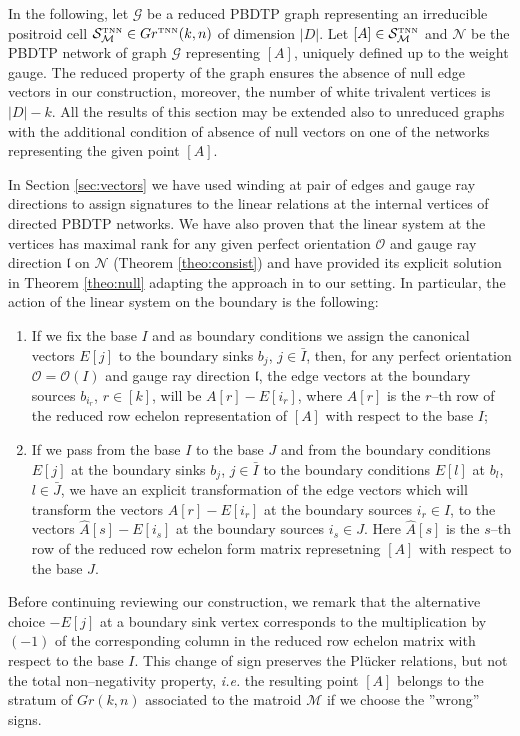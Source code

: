 \documentclass[11pt]{amsart}
\theoremstyle{plain}
\numberwithin{equation}{section}
\def \GTNN {{Gr^{\mbox{\tiny TNN}} (k,n)}}
\def \S {{\mathcal S}_{\mathcal M}^{\mbox{\tiny TNN}}}
\begin{document}
In the following, let $\mathcal G$ be a reduced PBDTP graph representing an irreducible positroid cell $\S \in \GTNN$ of dimension $|D|$. Let $[A]\in \S$ and $\mathcal N$ be the PBDTP network of graph $\mathcal G$ representing $[A]$, uniquely defined up to the weight gauge. The reduced property of the graph ensures the absence of null edge vectors in our construction, moreover, the number of white trivalent vertices is $|D|-k$. All the results of this section may be extended also to unreduced graphs with the additional condition of absence of null vectors on one of the networks representing the given point $[A]$.

In Section \ref{sec:vectors} we have used winding at pair of edges and gauge ray directions to assign signatures to the linear relations at the internal vertices of directed PBDTP networks. We have also proven that the linear system at the vertices has maximal rank for any given perfect orientation $\mathcal O$ and gauge ray direction $\mathfrak l$ on $\mathcal N$ (Theorem \ref{theo:consist}) and have provided its explicit solution in Theorem \ref{theo:null} adapting the approach in \cite{Tal2} to our setting. In particular, the action of the linear system on the boundary is the following:
\begin{enumerate}
\item If we fix the base $I$ and as boundary conditions we assign the canonical vectors $E[j]$ to the boundary sinks $b_j$, $j\in \bar I$, then, for any perfect orientation $\mathcal O=\mathcal O(I)$ and gauge ray direction $\mathfrak l$, the edge vectors at the boundary sources $b_{i_r}$, $r\in [k]$, will be $A[r]-E[i_r]$, where $A[r]$ is the $r$--th row of the reduced row echelon representation of $[A]$ with respect to the base $I$;
\item If we pass from the base $I$ to the base $J$ and from the boundary conditions $E[j]$ at the boundary sinks $b_j$, $j\in \bar I$ to the boundary conditions $E[l]$ at $b_l$, $l\in \bar J$, we have an explicit transformation of the edge vectors which will transform the vectors $A[r]-E[i_r]$ at the boundary sources $i_r\in I$, to the vectors $\hat A[s]-E[i_s]$ at the boundary sources $i_s\in J$. Here $\hat A [s]$ is the $s$--th row of the reduced row echelon form matrix represetning $[A]$ with respect to the base $J$.
\end{enumerate} 
Before continuing reviewing our construction, we remark that the alternative choice $-E[j]$ at a boundary sink vertex corresponds to the multiplication by $(- 1)$ of the corresponding column in the reduced row echelon matrix with respect to the base $I$. This change of sign preserves the Pl\"ucker relations, but not the total non--negativity property, {\sl i.e.} the resulting point $[A]$ belongs to the stratum of $Gr(k,n)$ associated to the matroid $\mathcal M$ if we choose the ''wrong'' signs.
\end{document}
